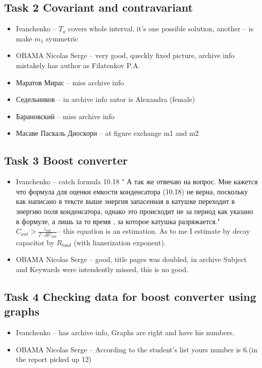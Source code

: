 \documentclass[a4paper,landscape,11pt]{article}
\begin{document}
\subsection{Task 2 Covariant and contravariant}
\begin{itemize}
\item Ivanchenko -- $T_a$ covers whole interval, it's one possible solution, another -- is make $m_1$ symmetric
\item OBAMA Nicolas Serge -- very good, queckly fixed picture, archive info mistakely has author as Filatenkov P.A.
\item Маратов Мирас  --  miss archive info
\item Седельников -- in archive info autor is Alexandra (female)
\item Барановский  --  miss archive info
\item Масаве Паскаль Диоскори -- at figure exchange m1 and m2
\end{itemize}

\subsection{Task 3 Boost converter}
\begin{itemize}
\item Ivanchenko -- catch formula 10.18 
" А так же отвечаю на вопрос. Мне кажется что формула для оценки емкости конденсатора (10.18) не верна, поскольку как написано в тексте выше энергия запасенная в катушке переходит в энергию поля конденсатора, однако это происходит не за период как указано в формуле, а лишь за то время , за которое катушка разряжается." 
$C_{out}> \frac{i_{out}}{f\cdot \Delta U_{out}}$-- this equation is an estimation.
As to me I estimate by decay capacitor by $R_{load}$ (with lianerization exponent).

\item OBAMA Nicolas Serge -- good, title pages was doubled, in archive Subject and Keywards were intendently missed, this is no good. 
\end{itemize}

\subsection{Task 4 Сhecking data for boost converter using graphs}
\begin{itemize}
\item Ivanchenko -- has archive info, Graphs are right and have his numbers.

\item OBAMA Nicolas Serge -- According to the student's list yours number is 6.(in the report picked up 12)
\end{itemize}
\end{document}
